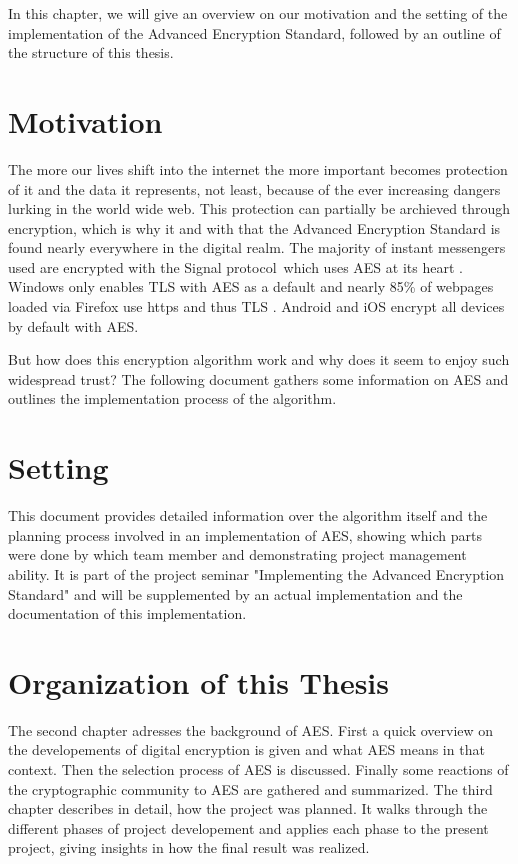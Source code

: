 
In this chapter, we will give an overview on our motivation and the setting of the implementation of the Advanced Encryption Standard, followed by an outline of the structure of this thesis.
 

\section{Motivation}
\label{ch:motivation}
The more our lives shift into the internet the more important becomes protection of it and the data it represents, not least, because of the ever increasing dangers lurking in the world wide web. This protection can partially be archieved through encryption, which is why it and with that the Advanced Encryption Standard is found nearly everywhere in the digital realm. The majority  of instant messengers used \cite{instantmessages} are encrypted with the Signal protocol\cite{whatsapp}\cite{fbmessenger}\, which uses AES at its heart \cite[ch. 5.2]{signal}. Windows only enables TLS with AES as a default \cite{wintls} and nearly 85\% of webpages loaded via Firefox use https and thus TLS \cite{fftelem}. Android \cite{android} and iOS \cite{ios}encrypt all devices by default with AES. 

But how does this encryption algorithm work and why does it seem to enjoy such widespread trust? The following document gathers some information on AES and outlines the implementation process of the algorithm.

\section{Setting}
\label{ch:setting}

This document provides detailed information over the algorithm itself and the planning process involved in an implementation of AES, showing which parts were done by which team member and demonstrating project management ability. It is part of the project seminar "Implementing the Advanced Encryption Standard" and will be supplemented by an actual implementation and the documentation of this implementation.

\section{Organization of this Thesis}
\label{ch:organizationofthisthesis}

The second chapter adresses the background of AES. First a quick overview on the developements of digital encryption is given and what AES means in that context. Then the selection process of AES is discussed. Finally some reactions of the cryptographic community to AES are gathered and summarized.
The third chapter describes in detail, how the project was planned. It walks through the different phases of project developement and applies each phase to the present project, giving insights in how the final result was realized.

